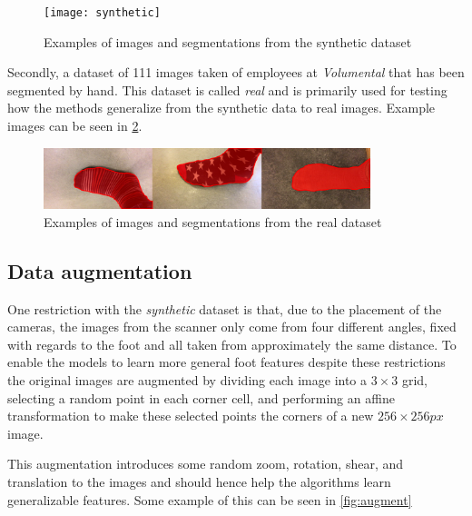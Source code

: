 \documentclass{kththesis}
\begin{document}
\begin{figure}[h]
  \centering
  \texttt{[image: synthetic]}
  \caption{Examples of images and segmentations from the synthetic dataset}
  \label{fig:data_synthetic}
\end{figure}

Secondly, a dataset of 111 images taken of employees at \textit{Volumental} that
has been segmented by hand. This dataset is called \textit{real} and is
primarily used for testing how the methods generalize from the synthetic data to
real images. Example images can be seen in \cref{fig:data_real}.

\begin{figure}[h]
  \centering
  \includegraphics[width=0.85\textwidth]{real}
  \caption{Examples of images and segmentations from the real dataset}
  \label{fig:data_real}
\end{figure}

\subsection{Data augmentation}
One restriction with the \textit{synthetic} dataset is that, due to the
placement of the cameras, the images from the
scanner only come from four different angles, fixed with regards to the
foot and all taken from approximately the same
distance. To enable the models to learn more general foot features despite
these restrictions the original images are augmented by dividing each image into
a \(3\times3\) grid, selecting a random point in each corner cell, and
performing an affine transformation to make these selected points the corners of
a new \(256\times256 \textit{px}\) image.

This augmentation introduces some random zoom, rotation, shear, and translation
to the images and should hence help the algorithms learn generalizable features.
Some example of this can be seen in \cref{fig:augment}
\end{document}

